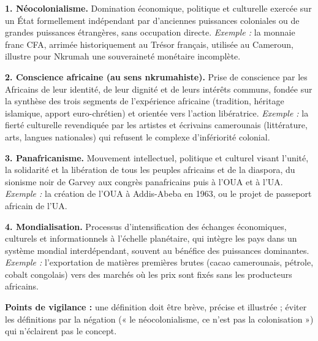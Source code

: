 \documentclass[11pt]{article}
\begin{document}
\begin{corrige}

\textbf{1. Néocolonialisme.} Domination économique, politique et culturelle exercée sur un État formellement indépendant par d'anciennes puissances coloniales ou de grandes puissances étrangères, sans occupation directe. \emph{Exemple :} la monnaie franc CFA, arrimée historiquement au Trésor français, utilisée au Cameroun, illustre pour Nkrumah une souveraineté monétaire incomplète.

\textbf{2. Conscience africaine (au sens nkrumahiste).} Prise de conscience par les Africains de leur identité, de leur dignité et de leurs intérêts communs, fondée sur la synthèse des trois segments de l'expérience africaine (tradition, héritage islamique, apport euro-chrétien) et orientée vers l'action libératrice. \emph{Exemple :} la fierté culturelle revendiquée par les artistes et écrivains camerounais (littérature, arts, langues nationales) qui refusent le complexe d'infériorité colonial.

\textbf{3. Panafricanisme.} Mouvement intellectuel, politique et culturel visant l'unité, la solidarité et la libération de tous les peuples africains et de la diaspora, du sionisme noir de Garvey aux congrès panafricains puis à l'OUA et à l'UA. \emph{Exemple :} la création de l'OUA à Addis-Abeba en 1963, ou le projet de passeport africain de l'UA.

\textbf{4. Mondialisation.} Processus d'intensification des échanges économiques, culturels et informationnels à l'échelle planétaire, qui intègre les pays dans un système mondial interdépendant, souvent au bénéfice des puissances dominantes. \emph{Exemple :} l'exportation de matières premières brutes (cacao camerounais, pétrole, cobalt congolais) vers des marchés où les prix sont fixés sans les producteurs africains.

\textbf{Points de vigilance :} une définition doit être brève, précise et illustrée ; éviter les définitions par la négation (« le néocolonialisme, ce n'est pas la colonisation ») qui n'éclairent pas le concept.
\end{corrige}
\end{document}
